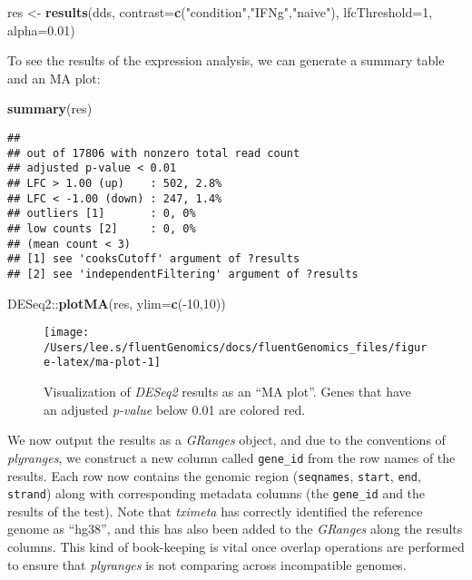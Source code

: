 \documentclass[
]{article}
\newenvironment{Shaded}{}{}
\newcommand{\DataTypeTok}[1]{\textcolor[rgb]{0.56,0.13,0.00}{#1}}
\newcommand{\DecValTok}[1]{\textcolor[rgb]{0.25,0.63,0.44}{#1}}
\newcommand{\FloatTok}[1]{\textcolor[rgb]{0.25,0.63,0.44}{#1}}
\newcommand{\KeywordTok}[1]{\textcolor[rgb]{0.00,0.44,0.13}{\textbf{#1}}}
\newcommand{\NormalTok}[1]{#1}
\newcommand{\OperatorTok}[1]{\textcolor[rgb]{0.40,0.40,0.40}{#1}}
\newcommand{\StringTok}[1]{\textcolor[rgb]{0.25,0.44,0.63}{#1}}
\begin{document}
\begin{Shaded}
\begin{Highlighting}[]
\NormalTok{res <-}\StringTok{ }\KeywordTok{results}\NormalTok{(dds,}
               \DataTypeTok{contrast=}\KeywordTok{c}\NormalTok{(}\StringTok{"condition"}\NormalTok{,}\StringTok{"IFNg"}\NormalTok{,}\StringTok{"naive"}\NormalTok{),}
               \DataTypeTok{lfcThreshold=}\DecValTok{1}\NormalTok{, }\DataTypeTok{alpha=}\FloatTok{0.01}\NormalTok{)}
\end{Highlighting}
\end{Shaded}

To see the results of the expression analysis, we can generate a summary table
and an MA plot:

\begin{Shaded}
\begin{Highlighting}[]
\KeywordTok{summary}\NormalTok{(res)}
\end{Highlighting}
\end{Shaded}

\begin{verbatim}
## 
## out of 17806 with nonzero total read count
## adjusted p-value < 0.01
## LFC > 1.00 (up)    : 502, 2.8%
## LFC < -1.00 (down) : 247, 1.4%
## outliers [1]       : 0, 0%
## low counts [2]     : 0, 0%
## (mean count < 3)
## [1] see 'cooksCutoff' argument of ?results
## [2] see 'independentFiltering' argument of ?results
\end{verbatim}

\begin{Shaded}
\begin{Highlighting}[]
\NormalTok{DESeq2}\OperatorTok{::}\KeywordTok{plotMA}\NormalTok{(res, }\DataTypeTok{ylim=}\KeywordTok{c}\NormalTok{(}\OperatorTok{-}\DecValTok{10}\NormalTok{,}\DecValTok{10}\NormalTok{))}
\end{Highlighting}
\end{Shaded}

\begin{figure}

{\centering \texttt{[image: /Users/lee.s/fluentGenomics/docs/fluentGenomics\_files/figure-latex/ma-plot-1]} 

}

\caption{Visualization of \emph{DESeq2} results as an ``MA plot''. Genes that have an adjusted \emph{p-value} below 0.01 are colored red.}\label{fig:ma-plot}
\end{figure}

We now output the results as a \emph{GRanges} object, and due to the conventions of
\emph{plyranges}, we construct a new column called \texttt{gene\_id} from the row names of
the results. Each row now contains the genomic region (\texttt{seqnames}, \texttt{start},
\texttt{end}, \texttt{strand}) along with corresponding metadata columns (the \texttt{gene\_id} and
the results of the test). Note that \emph{tximeta} has correctly identified the
reference genome as ``hg38'', and this has also been added to the \emph{GRanges} along
the results columns. This kind of book-keeping is vital once overlap operations
are performed to ensure that \emph{plyranges} is not comparing across incompatible
genomes.
\end{document}
